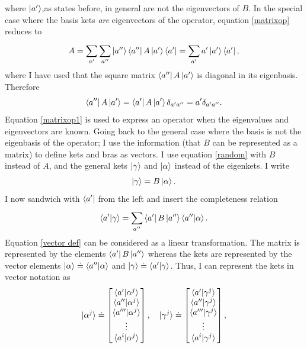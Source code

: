 where $\ket{a'}$,as states before, in general are not the eigenvectors of $B$. In the special case where the basis kets \emph{are} eigenvectors of the operator, equation \eqref{matrixop} reduces to
\begin{equation}
	A=\sum_{a'}^{}\sum_{a''}^{}\ket{a''}\bra{a''}A\ket{a'}\bra{a'}=\sum_{a'}^{}a'\ket{a'}\bra{a'},
	\label{matrixop1}
\end{equation} 
where I have used that the square matrix $\bra{a''}A\ket{a'}$ is diagonal in its eigenbasis. Therefore
\begin{equation}
	\bra{a''}A\ket{a'}=\bra{a'}A\ket{a'}\delta_{a'a''}=a'\delta_{a'a''}.
	\label{matrixop2}
\end{equation} 
Equation \eqref{matrixop1} is used to express an operator when the eigenvalues and eigenvectors are known.\newline
Going back to the general case where the basis is not the eigenbasis of the operator; I use the information (that $B$ can be represented as a matrix) to define kets and bras as vectors. I use equation \eqref{random} with $B$ instead of $A$, and the general kets $\ket{\gamma}$ and $\ket{\alpha}$ instead of the eigenkets. I write
\begin{equation}
	\ket{\gamma}=B\ket{\alpha}.
\end{equation}  
I now sandwich with $\bra{a'}$ from the left and insert the completeness relation
\begin{equation}
	\braket{a'|\gamma}=\sum_{a''}^{}\bra{a'}B\ket{a''}\braket{a''|\alpha}.
	\label{vector def}
\end{equation}  
Equation \eqref{vector def} can be considered as a linear transformation. The matrix is represented by the elements $\bra{a'}B\ket{a''}$ whereas the kets are represented by the vector elements $\ket{\alpha}\doteq\braket{a''|\alpha}$ and $\ket{\gamma}\doteq\braket{a'|\gamma}$. Thus, I can represent the kets in vector notation as
\begin{equation}
	\ket{\alpha^j}\doteq\begin{bmatrix}\braket{a'|\alpha^j}\\ \braket{a''|\alpha^j}\\ \braket{a'''|\alpha^j}\\ \vdots \\\braket{a^{i}|\alpha^j}\end{bmatrix}, \quad
	\ket{\gamma^j}\doteq\begin{bmatrix}\braket{a'|\gamma^j}\\ \braket{a''|\gamma^j}\\ \braket{a'''|\gamma^j}\\ \vdots \\\braket{a^{i}|\gamma^j}\end{bmatrix},
\end{equation} 
